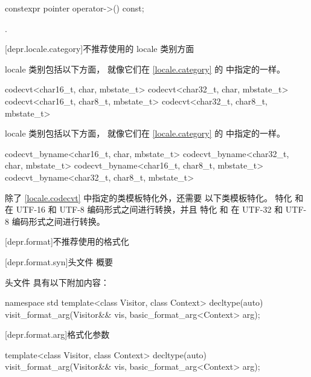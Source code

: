%
\begin{itemdecl}
constexpr pointer operator->() const;
\end{itemdecl}

\begin{itemdescr}
\pnum
\returns
{}.
\end{itemdescr}

[depr.locale.category]{不推荐使用的 locale 类别方面}

\pnum
{} locale 类别包括以下方面，
就像它们在 \ref{locale.category} 的  中指定的一样。

\begin{codeblock}
codecvt<char16_t, char, mbstate_t>
codecvt<char32_t, char, mbstate_t>
codecvt<char16_t, char8_t, mbstate_t>
codecvt<char32_t, char8_t, mbstate_t>
\end{codeblock}

\pnum
{} locale 类别包括以下方面，
就像它们在 \ref{locale.category} 的  中指定的一样。

\begin{codeblock}
codecvt_byname<char16_t, char, mbstate_t>
codecvt_byname<char32_t, char, mbstate_t>
codecvt_byname<char16_t, char8_t, mbstate_t>
codecvt_byname<char32_t, char8_t, mbstate_t>
\end{codeblock}

\pnum
除了 \ref{locale.codecvt} 中指定的类模板特化外，还需要
以下类模板特化。
%
%
特化  和
在 UTF-16 和 UTF-8 编码形式之间进行转换，并且
%
特化  和
在 UTF-32 和 UTF-8 编码形式之间进行转换。

[depr.format]{不推荐使用的格式化}

[depr.format.syn]{头文件  概要}

\pnum
头文件  具有以下附加内容：

\begin{codeblock}
namespace std {
  template<class Visitor, class Context>
    decltype(auto) visit_format_arg(Visitor&& vis, basic_format_arg<Context> arg);
}
\end{codeblock}

[depr.format.arg]{格式化参数}

%
\begin{itemdecl}
template<class Visitor, class Context>
  decltype(auto) visit_format_arg(Visitor&& vis, basic_format_arg<Context> arg);
\end{itemdecl}

